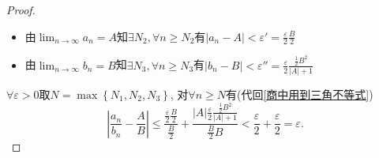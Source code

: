 \begin{proof}
\begin{itemize}
      \item 由$\lim_{n \to \infty}a_n = A$知$\exists N_2, \forall  n\ge  N_2$有$|a_n -A| < \varepsilon' = \frac{\varepsilon}{2} \frac{B}{2} $
      
      \item 由$\lim_{n \to \infty}b_n = B$知$\exists N_3, \forall n\ge N_3$有$|b_n-B| < \varepsilon'' = \frac{\varepsilon}{2} \frac{\frac{1}{2}B^2 }{|A|+1} $
    \end{itemize}
  
    $\forall \varepsilon > 0$取$N = \max\left\{ N_1, N_2,N_3 \right\} $, 对$\forall n\ge  N$有(代回\eqref{商中用到三角不等式})
    \begin{equation}
      \left| \frac{a_n}{b_n} - \frac{A}{B} \right|  \le  \frac{\frac{\varepsilon}{2} \frac{B}{2}}{\frac{B}{2}} + \frac{|A| \frac{\varepsilon}{2} \frac{\frac{1}{2} B^2}{|A|+1}}{\frac{B}{2} B} < \frac{\varepsilon}{2} + \frac{\varepsilon}{2} = \varepsilon.
    \end{equation}
\end{proof}